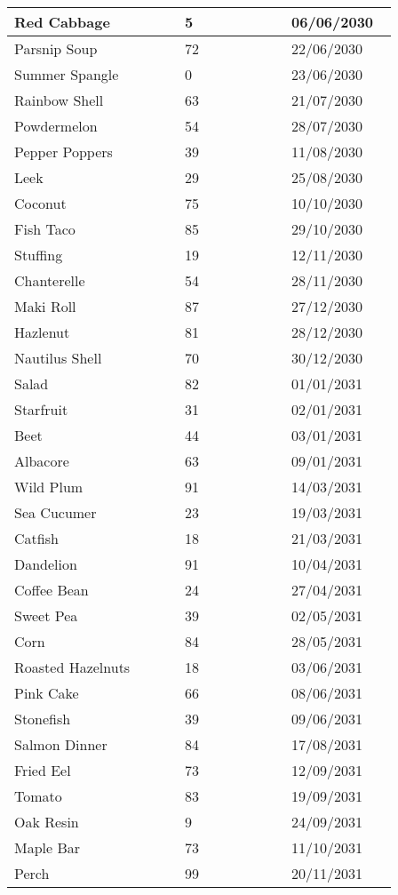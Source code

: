 \documentclass{article}
\begin{document}
\begin{longtable}{|p{0.4\linewidth}|p{0.25\linewidth}|p{0.25\linewidth}|}
\hline
Red Cabbage & 5 & 06/06/2030 \\
\hline
Parsnip Soup & 72 & 22/06/2030 \\
\hline
Summer Spangle & 0 & 23/06/2030 \\
\hline
Rainbow Shell & 63 & 21/07/2030 \\
\hline
Powdermelon & 54 & 28/07/2030 \\
\hline
Pepper Poppers & 39 & 11/08/2030 \\
\hline
Leek & 29 & 25/08/2030 \\
\hline
Coconut & 75 & 10/10/2030 \\
\hline
Fish Taco & 85 & 29/10/2030 \\
\hline
Stuffing & 19 & 12/11/2030 \\
\hline
Chanterelle & 54 & 28/11/2030 \\
\hline
Maki Roll & 87 & 27/12/2030 \\
\hline
Hazlenut & 81 & 28/12/2030 \\
\hline
Nautilus Shell & 70 & 30/12/2030 \\
\hline
Salad & 82 & 01/01/2031 \\
\hline
Starfruit & 31 & 02/01/2031 \\
\hline
Beet & 44 & 03/01/2031 \\
\hline
Albacore & 63 & 09/01/2031 \\
\hline
Wild Plum & 91 & 14/03/2031 \\
\hline
Sea Cucumer & 23 & 19/03/2031 \\
\hline
Catfish & 18 & 21/03/2031 \\
\hline
Dandelion & 91 & 10/04/2031 \\
\hline
Coffee Bean & 24 & 27/04/2031 \\
\hline
Sweet Pea & 39 & 02/05/2031 \\
\hline
Corn & 84 & 28/05/2031 \\
\hline
Roasted Hazelnuts & 18 & 03/06/2031 \\
\hline
Pink Cake & 66 & 08/06/2031 \\
\hline
Stonefish & 39 & 09/06/2031 \\
\hline
Salmon Dinner & 84 & 17/08/2031 \\
\hline
Fried Eel & 73 & 12/09/2031 \\
\hline
Tomato & 83 & 19/09/2031 \\
\hline
Oak Resin & 9 & 24/09/2031 \\
\hline
Maple Bar & 73 & 11/10/2031 \\
\hline
Perch & 99 & 20/11/2031 \\

\end{longtable}
\end{document}
